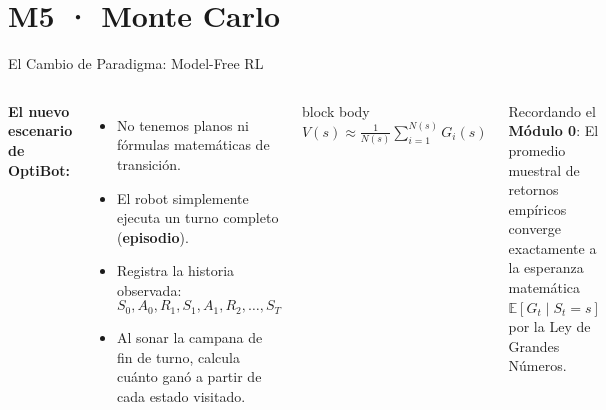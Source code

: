 \section{M5 · Monte Carlo}

\begin{frame}{El Cambio de Paradigma: Model-Free RL}
  \begin{columns}[c,onlytextwidth]
      \textbf{El nuevo escenario de OptiBot:}
      \begin{itemize}
        \item No tenemos planos ni fórmulas matemáticas de transición.
        \item El robot simplemente ejecuta un turno completo (\textbf{episodio}).
        \item Registra la historia observada:
        \[
          S_0, A_0, R_1, S_1, A_1, R_2, \dots, S_T
        \]
        \item Al sonar la campana de fin de turno, calcula cuánto ganó a partir de cada estado visitado.
      \end{itemize}
      \begin{beamercolorbox}[rounded=true,sep=0.8em]{block body}
        \centering
        {\large $V(s) \approx \frac{1}{N(s)} \sum_{i=1}^{N(s)} G_i(s)$}
      \end{beamercolorbox}
      \vspace{0.3cm}
      \small Recordando el \textbf{Módulo 0}: El promedio muestral de retornos empíricos converge exactamente a la esperanza matemática $\mathbb{E}[G_t \mid S_t=s]$ por la Ley de Grandes Números.
  \end{columns}
  \vspace{0.4cm}
\end{frame}

